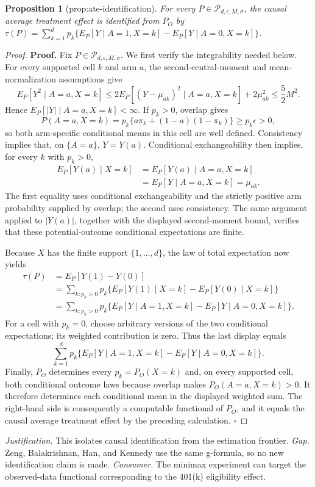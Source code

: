 \documentclass{article}
\newtheorem{proposition}{Proposition}
\begin{document}
\begin{proposition}[prop:ate-identification]\label{prop:ate-identification}
For every \(P\in\mathcal P_{d,\epsilon,M,\sigma}\), the causal average treatment effect is identified from \(P_O\) by \(\tau(P)=\sum_{k=1}^{d}p_k\{E_P[Y\mid A=1,X=k]-E_P[Y\mid A=0,X=k]\}\).
\end{proposition}
\begin{proof}
\textbf{Proof.}
Fix \(P\in\mathcal P_{d,\epsilon,M,\sigma}\).  We first verify the integrability needed below.  For every supported cell \(k\) and arm \(a\), the second-central-moment and mean-normalization assumptions give
\[
 E_P[Y^2\mid A=a,X=k]
 \le 2E_P[(Y-\mu_{ak})^2\mid A=a,X=k]+2\mu_{ak}^2
 \le \frac52 M^2.
\]
Hence \(E_P[|Y|\mid A=a,X=k]<\infty\).  If \(p_k>0\), overlap gives
\[
 P(A=a,X=k)=p_k\{a\pi_k+(1-a)(1-\pi_k)\}\ge p_k\epsilon>0,
\]
so both arm-specific conditional means in this cell are well defined.  Consistency implies that, on \(\{A=a\}\), \(Y=Y(a)\).  Conditional exchangeability then implies, for every \(k\) with \(p_k>0\),
\[
 \begin{aligned}
 E_P[Y(a)\mid X=k]
 &=E_P[Y(a)\mid A=a,X=k] \\
 &=E_P[Y\mid A=a,X=k]
 =\mu_{ak}.
 \end{aligned}
\]
The first equality uses conditional exchangeability and the strictly positive arm probability supplied by overlap; the second uses consistency.  The same argument applied to \(|Y(a)|\), together with the displayed second-moment bound, verifies that these potential-outcome conditional expectations are finite.

Because \(X\) has the finite support \(\{1,\ldots,d\}\), the law of total expectation now yields
\[
 \begin{aligned}
 \tau(P)
 &=E_P[Y(1)-Y(0)] \\
 &=\sum_{k:p_k>0}p_k
 \bigl\{E_P[Y(1)\mid X=k]-E_P[Y(0)\mid X=k]\bigr\} \\
 &=\sum_{k:p_k>0}p_k
 \bigl\{E_P[Y\mid A=1,X=k]-E_P[Y\mid A=0,X=k]\bigr\}.
 \end{aligned}
\]
For a cell with \(p_k=0\), choose arbitrary versions of the two conditional expectations; its weighted contribution is zero.  Thus the last display equals
\[
 \sum_{k=1}^{d}p_k
 \bigl\{E_P[Y\mid A=1,X=k]-E_P[Y\mid A=0,X=k]\bigr\}.
\]
Finally, \(P_O\) determines every \(p_k=P_O(X=k)\) and, on every supported cell, both conditional outcome laws because overlap makes \(P_O(A=a,X=k)>0\).  It therefore determines each conditional mean in the displayed weighted sum.  The right-hand side is consequently a computable functional of \(P_O\), and it equals the causal average treatment effect by the preceding calculation. \(\square\)
\end{proof}
\par\smallskip\noindent \textit{Justification.} This isolates causal identification from the estimation frontier. \textit{Gap.} Zeng, Balakrishnan, Han, and Kennedy use the same g-formula, so no new identification claim is made. \textit{Consumer.} The minimax experiment can target the observed-data functional corresponding to the 401(k) eligibility effect.
\end{document}

